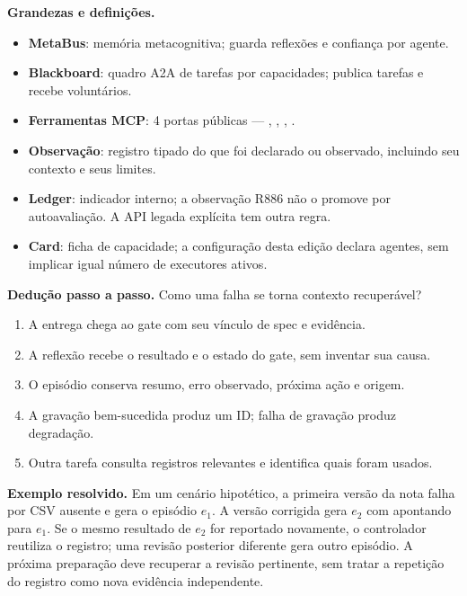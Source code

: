 \begin{definicao}
\textbf{Grandezas e definições.}
\begin{itemize}[leftmargin=1.3em,itemsep=1pt]
  \item \textbf{MetaBus}: memória metacognitiva; guarda reflexões e confiança por agente.
  \item \textbf{Blackboard}: quadro A2A de tarefas por capacidades; publica tarefas e recebe voluntários.
  \item \textbf{Ferramentas MCP}: 4 portas públicas --- , , , .
  \item \textbf{Observação}: registro tipado do que foi declarado ou observado,
        incluindo seu contexto e seus limites.
  \item \textbf{Ledger}: indicador interno; a observação R886 não o promove
        por autoavaliação. A API legada explícita tem outra regra.
  \item \textbf{Card}: ficha de capacidade; a configuração desta edição declara
        \CoreAgentCount{} agentes, sem implicar igual número de executores ativos.
\end{itemize}
\end{definicao}

\begin{metodo}
\textbf{Dedução passo a passo.} Como uma falha se torna contexto recuperável?
\begin{enumerate}[leftmargin=1.4em,itemsep=2pt]
  \item A entrega chega ao gate com seu vínculo de spec e evidência.
  \item A reflexão recebe o resultado e o estado do gate, sem inventar sua causa.
  \item O episódio conserva resumo, erro observado, próxima ação e origem.
  \item A gravação bem-sucedida produz um ID; falha de gravação produz degradação.
  \item Outra tarefa consulta registros relevantes e identifica quais foram usados.
\end{enumerate}
\end{metodo}

\begin{resultado}
\textbf{Exemplo resolvido.} Em um cenário hipotético, a primeira versão da nota
falha por CSV ausente e gera o episódio $e_1$. A versão corrigida gera $e_2$
com  apontando para $e_1$. Se o mesmo resultado de $e_2$ for
reportado novamente, o controlador reutiliza o registro; uma revisão posterior
diferente gera outro episódio. A próxima preparação deve recuperar a revisão
pertinente, sem tratar a repetição do registro como nova evidência independente.
\end{resultado}

